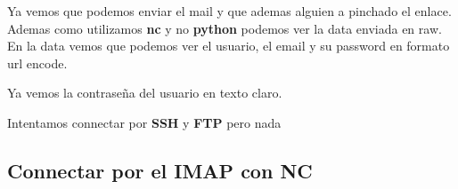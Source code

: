 \documentclass{assets/ipesethesis}
\newenvironment{Shaded}{\begin{snugshade}}{\end{snugshade}}
\newcommand{\ExtensionTok}[1]{#1}
\newcommand{\NormalTok}[1]{#1}
\newcommand{\OperatorTok}[1]{\textcolor[rgb]{0.81,0.36,0.00}{\textbf{#1}}}
\newcommand{\StringTok}[1]{\textcolor[rgb]{0.31,0.60,0.02}{#1}}
\begin{document}
Ya vemos que podemos enviar el mail y que ademas alguien a pinchado el enlace. Ademas como utilizamos \textbf{nc} y no \textbf{python}
podemos ver la data enviada en raw. En la data vemos que podemos ver el usuario, el email y su password en formato url encode.

\begin{Shaded}
\end{Shaded}

Ya vemos la contraseña del usuario en texto claro.

Intentamos connectar por \textbf{SSH} y \textbf{FTP} pero nada

\hypertarget{connectar-por-el-imap-con-nc}{%
\subsection*{Connectar por el IMAP con NC}\label{connectar-por-el-imap-con-nc}}
\end{document}
